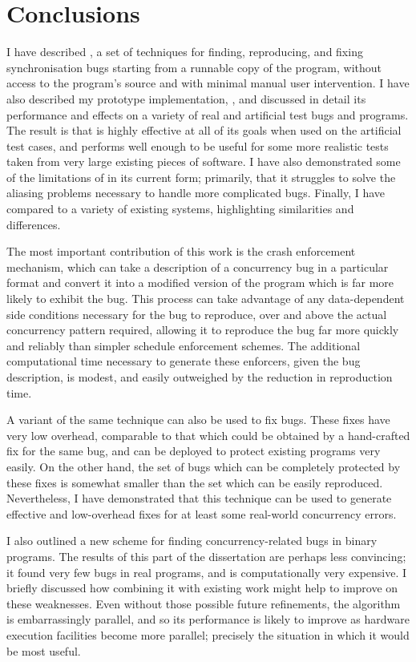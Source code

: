 \chapter{Conclusions}

I have described {\technique}, a set of techniques for finding,
reproducing, and fixing synchronisation bugs starting from a runnable
copy of the program, without access to the program's source and with
minimal manual user intervention.  I have also described my prototype
implementation, {\implementation}, and discussed in detail its
performance and effects on a variety of real and artificial test bugs
and programs.  The result is that {\technique} is highly effective at
all of its goals when used on the artificial test cases, and performs
well enough to be useful for some more realistic tests taken from very
large existing pieces of software.  I have also demonstrated some of
the limitations of {\technique} in its current form; primarily, that
it struggles to solve the aliasing problems necessary to handle more
complicated bugs.  Finally, I have compared {\technique} to a variety
of existing systems, highlighting similarities and differences.

The most important contribution of this work is the crash enforcement
mechanism, which can take a description of a concurrency bug in a
particular format and convert it into a modified version of the
program which is far more likely to exhibit the bug.  This process can
take advantage of any data-dependent side conditions necessary for the
bug to reproduce, over and above the actual concurrency pattern
required, allowing it to reproduce the bug far more quickly and
reliably than simpler schedule enforcement schemes.  The additional
computational time necessary to generate these enforcers, given the
bug description, is modest, and easily outweighed by the reduction in
reproduction time.

A variant of the same technique can also be used to fix bugs.  These
fixes have very low overhead, comparable to that which could be
obtained by a hand-crafted fix for the same bug, and can be deployed
to protect existing programs very easily.  On the other hand, the set
of bugs which can be completely protected by these fixes is somewhat
smaller than the set which can be easily reproduced.  Nevertheless, I
have demonstrated that this technique can be used to generate
effective and low-overhead fixes for at least some real-world
concurrency errors.

I also outlined a new scheme for finding concurrency-related bugs in
binary programs.  The results of this part of the dissertation are
perhaps less convincing; it found very few bugs in real programs, and
is computationally very expensive.  I briefly discussed how combining
it with existing work might help to improve on these weaknesses.  Even
without those possible future refinements, the algorithm is
embarrassingly parallel, and so its performance is likely to improve
as hardware execution facilities become more parallel; precisely the
situation in which it would be most useful.
